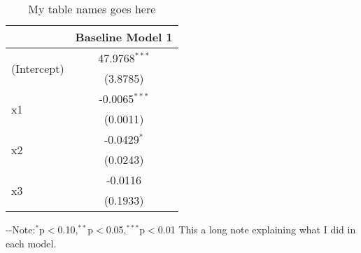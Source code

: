 \begin{table}[H] 
\centering 
\caption{My table names goes here} 
\label{tab:myLabel}
\begin{threeparttable}
\begin{tabular}{lc}
\toprule 
& Baseline Model 1 \\ 
\midrule 
\multirow{2}{*}{(Intercept)}&47.9768$^{***}$ \\ 
& (3.8785) \\ 
\multirow{2}{*}{x1}&-0.0065$^{***}$ \\ 
& (0.0011) \\ 
\multirow{2}{*}{x2}&-0.0429$^{*}$ \\ 
& (0.0243) \\ 
\multirow{2}{*}{x3}&-0.0116 \\ 
& (0.1933) \\ 
\bottomrule 
\end{tabular} 
\begin{tablenotes} 
\scriptsize 
\item \leavevmode\kern-\scriptspace\kern- Note:$^{*}$p$<$0.10,$^{**}$p$<$0.05,$^{***}$p$<$0.01 This a long note explaining what I did in each model. 
\end{tablenotes}
\end{threeparttable} 
\end{table} 
 